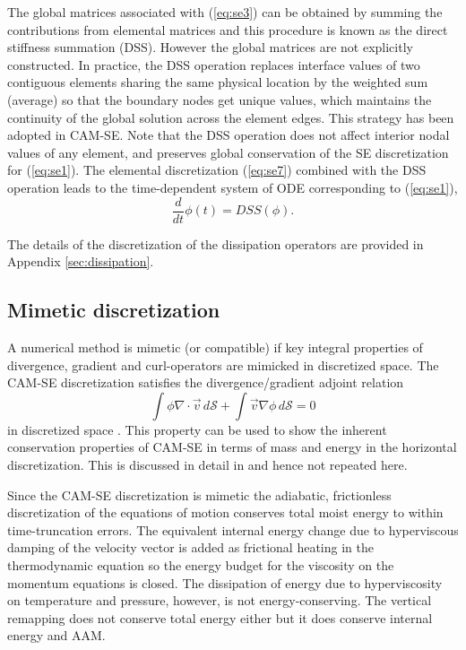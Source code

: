 \documentclass{agujournal}
\begin{document}
{  The  global matrices associated with  (\ref{eq:se3}) can be obtained 
  by  summing the contributions from elemental matrices  and  this procedure is known as the 
  direct stiffness summation (DSS). However the global matrices are  not explicitly constructed. 
  In practice, the DSS operation replaces  interface values  of two  contiguous elements sharing the same physical location  
  by the  weighted sum (average)  so that  the boundary  nodes get unique values,   
   which maintains the continuity of the global solution across the element edges. This strategy has been adopted in CAM-SE. 
  Note that the DSS operation does not affect interior nodal values of any element, and  preserves global conservation of the SE discretization
  for (\ref{eq:se1}).  The elemental discretization (\ref{eq:se7}) combined with the  DSS operation  leads 
  to the time-dependent  system of ODE corresponding to (\ref{eq:se1}),
     \begin{equation}
  \frac{d }{dt} \phi(t) =   DSS(\phi).  \label{eq:se8}
       \end{equation}

The details of the discretization of the dissipation operators are provided in Appendix \ref{sec:dissipation}.
%
\subsection{Mimetic discretization}
A numerical method is mimetic (or compatible) if key integral properties of divergence, gradient and curl-operators are mimicked in discretized space. The CAM-SE discretization satisfies the divergence/gradient adjoint relation
\begin{equation}
\int \phi \nabla \cdot \vec{v} \, d\mathcal{S}+\int \vec{v} \nabla \phi \, d\mathcal{S}=0
\end{equation}
in  discretized space \citep{TF2010JCP}. This property can be used to show the inherent conservation properties of CAM-SE in terms of mass and energy in the horizontal discretization. This is discussed in detail in \cite{T2011LNCSEb} and hence not repeated here. 

Since the CAM-SE discretization is mimetic the adiabatic, frictionless discretization of the equations of motion conserves total moist energy to within time-truncation errors. The equivalent internal energy change due to hyperviscous damping of the velocity vector is added as frictional heating in the thermodynamic equation so the energy budget for the viscosity on the momentum equations is closed. The dissipation of energy due to hyperviscosity on temperature and pressure, however, is not energy-conserving. The vertical remapping does not conserve total energy either but it does conserve internal energy and AAM.


}
\end{document}
